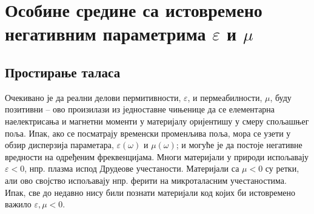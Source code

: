 \section{Особине средине са истовремено негативним параметрима $\varepsilon$ и $\mu$}
\subsection{Простирање таласа}

Очекивано је да реални делови пермитивности, $\varepsilon$, и пермеабилности, $\mu$, буду позитивни – ово произилази из једноставне чињенице да се елементарна наелектрисања и магнетни моменти у материјалу оријентишу у смеру спољашњег поља. Ипак, ако се посматрају временски променљива поља, мора се узети у обзир дисперзија параметара, $\varepsilon(\omega)$ и $\mu(\omega)$; и могуће је да постоје негативне вредности на одређеним фреквенцијама. Многи материјали у природи испољавају $\varepsilon < 0$, нпр. плазма испод Друдеове учестаности. Материјали са $\mu<0$ су ретки, али ово својство испољавају нпр. ферити на микроталасним учестаностима. Ипак, све до недавно нису били познати материјали код којих би истовремено важило $\varepsilon,\mu < 0$.

